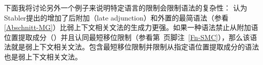     下面我将讨论另外一个例子来说明特定语言的限制会限制语法的复杂性： \citet[\S~3.2]{GM2007a}认为Stabler提出的增加了后附加（late adjunction）和外置的最简语法\indexmgc（参看\ref{Abschnitt-MG}）比弱上下文相关文法的生成力更强。如果一种语法禁止从附加语位置提取成分（\citealp[]{FG2002a}）并且认同最短移位限制（参看第~\pageref{Fn-SMC}页脚注~\ref{Fn-SMC}），那么该语法就是弱上下文相关文法\citep[]{GM2007a}。包含最短移位限制并限制从指定语位置提取成分的语法也是弱上下文相关文法。
